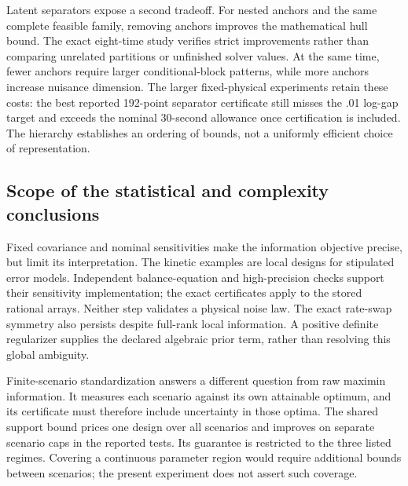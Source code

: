 Latent separators expose a second tradeoff. For nested anchors and the same
complete feasible family, removing anchors improves the mathematical hull
bound. The exact eight-time study verifies strict improvements rather than
comparing unrelated partitions or unfinished solver values. At the same time,
fewer anchors require larger conditional-block patterns, while more anchors
increase nuisance dimension. The larger fixed-physical experiments retain
these costs: the best reported 192-point separator certificate still misses
the .01 log-gap target and exceeds the nominal 30-second allowance once
certification is included. The hierarchy establishes an ordering of bounds,
not a uniformly efficient choice of representation.

\subsection{Scope of the statistical and complexity conclusions}

Fixed covariance and nominal sensitivities make the information objective
precise, but limit its interpretation. The kinetic examples are local designs
for stipulated error models. Independent balance-equation and high-precision
checks support their sensitivity implementation; the exact certificates apply
to the stored rational arrays. Neither step validates a physical noise law.
The exact rate-swap symmetry also persists despite full-rank local information.
A positive definite regularizer supplies the declared algebraic prior term,
rather than resolving this global ambiguity.

Finite-scenario standardization answers a different question from raw maximin
information. It measures each scenario against its own attainable optimum,
and its certificate must therefore include uncertainty in those optima. The
shared support bound prices one design over all scenarios and improves on
separate scenario caps in the reported tests. Its guarantee is restricted to
the three listed regimes. Covering a continuous parameter region would require
additional bounds between scenarios; the present experiment does not assert
such coverage.

